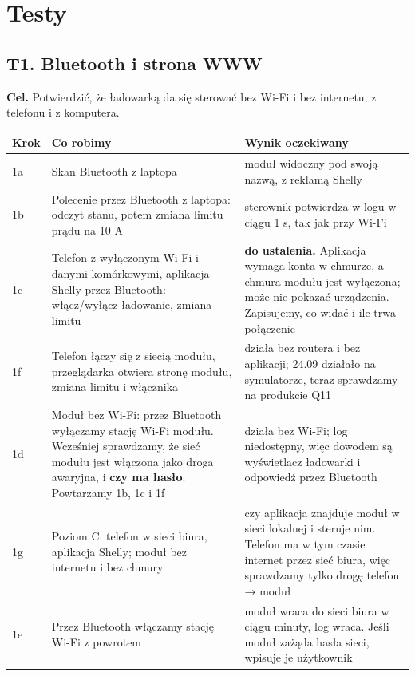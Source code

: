 \documentclass[11pt,a4paper]{article}
\begin{document}
\section{Testy}

\subsection{T1. Bluetooth i strona WWW}

\textbf{Cel.} Potwierdzić, że ładowarką da się sterować bez Wi-Fi i bez internetu, z telefonu i z komputera.


\begin{longtable}{>{\raggedright\arraybackslash}p{3.00cm}>{\raggedright\arraybackslash}p{6.14cm}>{\raggedright\arraybackslash}p{6.14cm}}
\toprule
\rowcolor{apteallight}\textbf{Krok} & \textbf{Co robimy} & \textbf{Wynik oczekiwany} \\
\midrule\endhead
\bottomrule\endfoot
1a & Skan Bluetooth z laptopa & moduł widoczny pod swoją nazwą, z reklamą Shelly \\
1b & Polecenie przez Bluetooth z laptopa: odczyt stanu, potem zmiana limitu prądu na 10 A & sterownik potwierdza w logu w ciągu 1 s, tak jak przy Wi-Fi \\
1c & Telefon z wyłączonym Wi-Fi i danymi komórkowymi, aplikacja Shelly przez Bluetooth: włącz/wyłącz ładowanie, zmiana limitu & \textbf{do ustalenia.} Aplikacja wymaga konta w chmurze, a chmura modułu jest wyłączona; może nie pokazać urządzenia. Zapisujemy, co widać i ile trwa połączenie \\
1f & Telefon łączy się z siecią modułu, przeglądarka otwiera stronę modułu, zmiana limitu i włącznika & działa bez routera i bez aplikacji; 24.09 działało na symulatorze, teraz sprawdzamy na produkcie Q11 \\
1d & Moduł bez Wi-Fi: przez Bluetooth wyłączamy stację Wi-Fi modułu. Wcześniej sprawdzamy, że sieć modułu jest włączona jako droga awaryjna, i \textbf{czy ma hasło}. Powtarzamy 1b, 1c i 1f & działa bez Wi-Fi; log niedostępny, więc dowodem są wyświetlacz ładowarki i odpowiedź przez Bluetooth \\
1g & Poziom C: telefon w sieci biura, aplikacja Shelly; moduł bez internetu i bez chmury & czy aplikacja znajduje moduł w sieci lokalnej i steruje nim. Telefon ma w tym czasie internet przez sieć biura, więc sprawdzamy tylko drogę telefon {\symbolfont→} moduł \\
1e & Przez Bluetooth włączamy stację Wi-Fi z powrotem & moduł wraca do sieci biura w ciągu minuty, log wraca. Jeśli moduł zażąda hasła sieci, wpisuje je użytkownik \\
\end{longtable}
\end{document}
